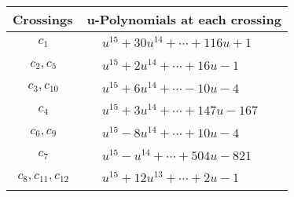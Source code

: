 \documentclass[1p]{elsarticle_modified}
\theoremstyle{definition}
\begin{document}
\begin{tabular}{m{50pt}|m{274pt}}
Crossings & \hspace{64pt}u-Polynomials at each crossing \\
\hline $$\begin{aligned}c_{1}\end{aligned}$$&$\begin{aligned}
&u^{15}+30 u^{14}+\cdots+116 u+1
\end{aligned}$\\
\hline $$\begin{aligned}c_{2},c_{5}\end{aligned}$$&$\begin{aligned}
&u^{15}+2 u^{14}+\cdots+16 u-1
\end{aligned}$\\
\hline $$\begin{aligned}c_{3},c_{10}\end{aligned}$$&$\begin{aligned}
&u^{15}+6 u^{14}+\cdots-10 u-4
\end{aligned}$\\
\hline $$\begin{aligned}c_{4}\end{aligned}$$&$\begin{aligned}
&u^{15}+3 u^{14}+\cdots+147 u-167
\end{aligned}$\\
\hline $$\begin{aligned}c_{6},c_{9}\end{aligned}$$&$\begin{aligned}
&u^{15}-8 u^{14}+\cdots+10 u-4
\end{aligned}$\\
\hline $$\begin{aligned}c_{7}\end{aligned}$$&$\begin{aligned}
&u^{15}- u^{14}+\cdots+504 u-821
\end{aligned}$\\
\hline $$\begin{aligned}c_{8},c_{11},c_{12}\end{aligned}$$&$\begin{aligned}
&u^{15}+12 u^{13}+\cdots+2 u-1
\end{aligned}$\\
\hline
\end{tabular}\\~\\
\newpage\renewcommand{\arraystretch}{1}
\end{document}
